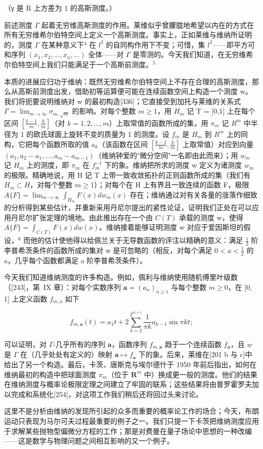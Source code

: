 （γ 是 R 上方差为 1 的高斯测度。）

前述测度 \(\Gamma\) 起着无穷维高斯测度的作用。莱维似乎曾朦胧地希望以内在的方式在所有无穷维希尔伯特空间上定义一个高斯测度。事实上，正如莱维与维纳所证明的，测度 \(\Gamma\) 在某种意义下\(^{4}\) 在 \(l^{2}\) 的自同构作用下不变；可惜，集 \(l^{2}\)——即平方可和序列 \((x_{1}, x_{2}, \ldots, x_{n}, \ldots)\) 全体——对 \(\Gamma\) 是零测的。今天我们知道，在无穷维希尔伯特空间上我们只能满足于一个高斯前测度。\(^{5}\)

本质的进展应归功于维纳：既然无穷维希尔伯特空间上不存在合理的高斯测度，那么从高斯前测度出发，借助初等运算便可能在连续函数空间上构造一个测度 w。我们将扼要说明维纳对 w 的最初构造{[}336{]}；它直接受到加托与莱维的关系式 \(\Gamma = \lim_{m \to \infty} \sigma_{m, \sqrt{m}}\) 的影响。对每个整数 \(m \geq 1\)，用 \(H_m\) 记 T = ]0,1] 上在每个区间 \(\left[\frac{k-1}{m}, \frac{k}{m}\right]\)（对 \(k = 1, 2, \ldots, m\)）上取常值的函数所成的集，用 \(\pi_m\) 记 \(R^m\) 中半径为 1 的欧氏球面上旋转不变的质量为 1 的测度。设 \(f_m\) 是 \(H_m\) 到 \(R^m\) 上的同构，它把每个函数所取的值 \(a_k\)（该函数在区间 \(\left[\frac{k-1}{m}, \frac{k}{m}\right]\) 上取常值）对应到向量 \((a_1, a_2 - a_1, \ldots, a_m - a_{m-1})\)（维纳钟爱的"微分空间"一名即由此而来）；用 \(w_m\) 记 \(H_m\) 上的测度，即 \(\pi_m\) 在 \(f_m^{-1}\) 下的象。维纳把所求的测度 w 定义为诸测度 \(w_m\) 的极限。精确地说，用 H 记 T 上带一致收敛拓扑的正则函数所成的集（我们有 \(H_m \subset H\)，对每个整数 \(m \geq 1\)）；对每个在 H 上有界且一致连续的函数 F，极限 \(A\{F\} = \lim_{m \to \infty} \int_{H_m} F(x) dw_m(x)\) 存在；维纳通过对有关各量的涨落作细致的分析得到某些估计，并重新采用丹尼尔提出的紧性论证，证明我们正处在可以应用丹尼尔扩张定理的境地。由此推出存在一个由 \(C(T)\) 承载的测度 w，使得 \(A\{F\} = \int_{C(T)} F(x) dw(x)\)。维纳接着能够证明测度 w 对应于爱因斯坦的假设，\(^{6}\) 而他的估计使他得以给佩兰关于无导数函数的评注以精确的意义：满足 \(\frac{1}{2}\) 阶李普希茨条件的函数所成的集对 w 是可忽略的（相反，对每个满足 \(0 < a < \frac{1}{2}\) 的 a，几乎每个函数都满足 a 阶李普希茨条件）。

今天我们知道维纳测度的许多构造。例如，佩利与维纳使用随机傅里叶级数（{[}243{]}，第~IX 章）：对每个实数序列 \(\mathbf{a} = (a_{n})_{n \geq 1}\) 与每个整数 \(m \geq 0\)，在 ]0, 1] 上定义函数 \(f_{m,a}\) 如下

\[
f _ {m, \mathbf {a}} (t) = a _ {1} t + 2 \sum_ {k = 2} ^ {2 ^ {m + 1}} \frac {1}{\pi k} a _ {k - 1} \sin \pi k t;
\]

可以证明，对 \(\Gamma\)-几乎所有的序列 \(\mathbf{a}\)，函数序列 \(f_{m,\mathbf{a}}\) 趋于一个连续函数 \(f_{\mathbf{a}}\)，且 \(w\) 是 \(\Gamma\) 在（几乎处处有定义的）映射 \(\mathbf{a} \mapsto f_{\mathbf{a}}\) 下的象。后来，莱维在{[}201 b 与 c{]}中给出了另一个构造。最后，卡茨、唐斯克与埃尔德什于 1950 年前后指出，如何在维纳最初的构造中把球面测度 \(\pi_m\)（位于 \(\mathbf{R}^m\) 中）换成更一般的测度。他们的结果在维纳测度与概率论极限定理之间建立了牢固的联系；这些结果将由普罗霍罗夫加以完成和系统化{[}254{]}，对这项工作我们稍后还将回过头来讨论。

这里不是分析由维纳的发现所引起的众多而重要的概率论工作的场合；今天，布朗运动只表现为马尔可夫过程最重要的例子之一。我们只提一下卡茨把维纳测度应用于求解某些抛物型偏微分方程的工作；那是对费曼在量子场论中思想的一种改编——这是数学与物理问题之间相互影响的又一个例子。

